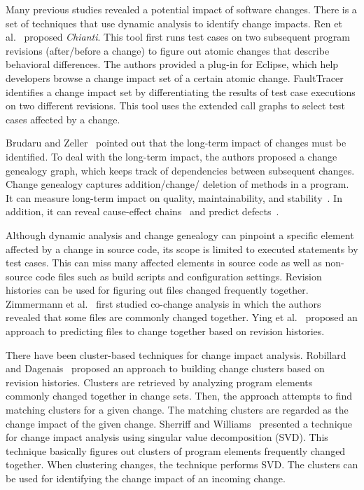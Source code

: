 Many previous studies revealed a potential impact of software changes. There is a
set of techniques that use dynamic analysis to identify change impacts. Ren et
al.~\cite{ren_chianti:_2004} proposed \emph{Chianti}. This tool first runs test
cases on two subsequent program revisions (after/before a change) to figure out
atomic changes that describe behavioral differences. The authors provided a
plug-in for Eclipse, which help developers browse a change impact set of a
certain atomic change. FaultTracer~\cite{zhang_faulttracer:_2012} identifies
a change impact set by differentiating the results of test case executions on
two different revisions. This tool uses the extended call graphs to select
test cases affected by a change.

Brudaru and Zeller~\cite{brudaru_what_2008} pointed out that the long-term
impact of changes must be identified. To deal with the long-term impact, the authors proposed
a change genealogy graph, which keeps track of dependencies between
subsequent changes. Change genealogy captures addition/change/ deletion of
methods in a program. It can measure long-term impact on quality,
maintainability, and stability~\cite{herzig_capturing_2010}. 
In addition, it can reveal cause-effect chains~\cite{herzig_mining_2011} and predict
defects~\cite{herzig_predicting_2013}.


Although dynamic analysis and change genealogy can pinpoint a specific element
affected by a change in source code, its scope is limited to executed statements
by test cases. This can miss many affected elements in source code as well as
non-source code files such as build scripts and configuration settings.
Revision histories can be used for figuring out files changed frequently
together. Zimmermann et al.~\cite{zimmermann_mining_2004} first studied
co-change analysis in which the authors revealed that some files are
commonly changed together. Ying et al.~\cite{ying_predicting_2004} proposed an
approach to predicting files to change together based on revision histories.


There have been cluster-based techniques for change impact analysis. Robillard
and Dagenais~\cite{robillard_retrieving_2008} proposed an approach to building
change clusters based on revision histories. Clusters are retrieved by analyzing
program elements commonly changed together in change sets. Then, the approach
attempts to find matching clusters for a given change. The matching clusters are
regarded as the change impact of the given change. Sherriff and
Williams~\cite{sherriff_empirical_2008} presented a technique for change impact
analysis using singular value decomposition (SVD). This technique basically
figures out clusters of program elements frequently changed together. When clustering
changes, the technique performs SVD. The clusters can be used for identifying
the change impact of an incoming change. 
 
